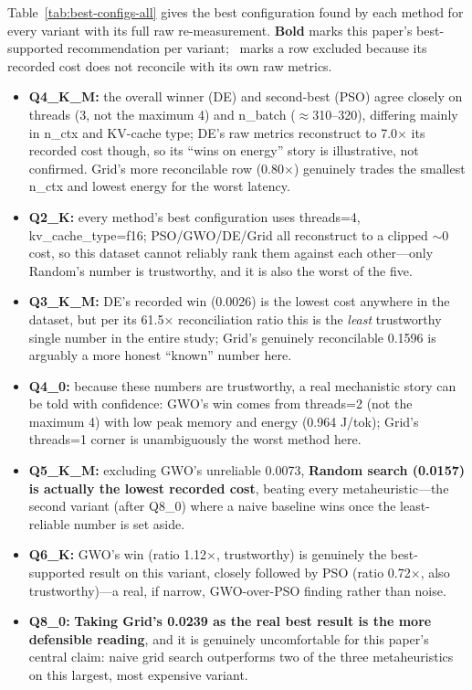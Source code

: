 \documentclass[conference, letterpaper]{IEEEtran}
\begin{document}
Table~\ref{tab:best-configs-all} gives the best configuration found by each method for every variant with its full raw re-measurement. \textbf{Bold} marks this paper's best-supported recommendation per variant; \textdagger\ marks a row excluded because its recorded cost does not reconcile with its own raw metrics.

\begin{itemize}
  \item \textbf{Q4\_K\_M:} the overall winner (DE) and second-best (PSO) agree closely on threads (3, not the maximum 4) and n\_batch ($\approx$310--320), differing mainly in n\_ctx and KV-cache type; DE's raw metrics reconstruct to 7.0$\times$ its recorded cost though, so its ``wins on energy'' story is illustrative, not confirmed. Grid's more reconcilable row (0.80$\times$) genuinely trades the smallest n\_ctx and lowest energy for the worst latency.
  \item \textbf{Q2\_K:} every method's best configuration uses threads=4, kv\_cache\_type=f16; PSO/GWO/DE/Grid all reconstruct to a clipped $\sim$0 cost, so this dataset cannot reliably rank them against each other---only Random's number is trustworthy, and it is also the worst of the five.
  \item \textbf{Q3\_K\_M:} DE's recorded win (0.0026) is the lowest cost anywhere in the dataset, but per its 61.5$\times$ reconciliation ratio this is the \emph{least} trustworthy single number in the entire study; Grid's genuinely reconcilable 0.1596 is arguably a more honest ``known'' number here.
  \item \textbf{Q4\_0:} because these numbers are trustworthy, a real mechanistic story can be told with confidence: GWO's win comes from threads=2 (not the maximum 4) with low peak memory and energy (0.964 J/tok); Grid's threads=1 corner is unambiguously the worst method here.
  \item \textbf{Q5\_K\_M:} excluding GWO's unreliable 0.0073, \textbf{Random search (0.0157) is actually the lowest recorded cost}, beating every metaheuristic---the second variant (after Q8\_0) where a naive baseline wins once the least-reliable number is set aside.
  \item \textbf{Q6\_K:} GWO's win (ratio 1.12$\times$, trustworthy) is genuinely the best-supported result on this variant, closely followed by PSO (ratio 0.72$\times$, also trustworthy)---a real, if narrow, GWO-over-PSO finding rather than noise.
  \item \textbf{Q8\_0:} \textbf{Taking Grid's 0.0239 as the real best result is the more defensible reading}, and it is genuinely uncomfortable for this paper's central claim: naive grid search outperforms two of the three metaheuristics on this largest, most expensive variant.
\end{itemize}
\end{document}
